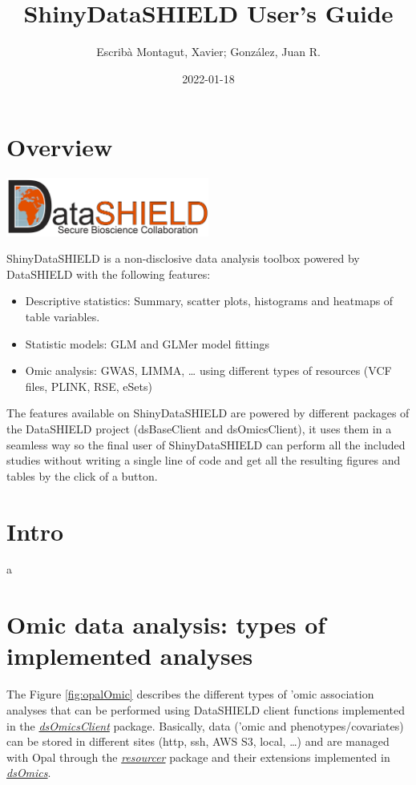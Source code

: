 \documentclass[
]{book}
\title{ShinyDataSHIELD User's Guide}
\author{Escribà Montagut, Xavier; González, Juan R.}
\date{2022-01-18}
\providecommand{\tightlist}{%
  \setlength{\itemsep}{0pt}\setlength{\parskip}{0pt}}
\begin{document}
\maketitle

{
\setcounter{tocdepth}{1}
\tableofcontents
}
\hypertarget{overview}{%
\chapter{Overview}\label{overview}}

\includegraphics[width=0.5\textwidth,height=\textheight]{fig/ds_logo.png}

ShinyDataSHIELD is a non-disclosive data analysis toolbox powered by DataSHIELD with the following features:

\begin{itemize}
\tightlist
\item
  Descriptive statistics: Summary, scatter plots, histograms and heatmaps of table variables.
\item
  Statistic models: GLM and GLMer model fittings
\item
  Omic analysis: GWAS, LIMMA, \ldots{} using different types of resources (VCF files, PLINK, RSE, eSets)
\end{itemize}

The features available on ShinyDataSHIELD are powered by different packages of the DataSHIELD project (dsBaseClient and dsOmicsClient), it uses them in a seamless way so the final user of ShinyDataSHIELD can perform all the included studies without writing a single line of code and get all the resulting figures and tables by the click of a button.

\hypertarget{intro}{%
\chapter{Intro}\label{intro}}

a

\hypertarget{Omic}{%
\chapter{Omic data analysis: types of implemented analyses}\label{Omic}}

The Figure \ref{fig:opalOmic} describes the different types of 'omic association analyses that can be performed using DataSHIELD client functions implemented in the \emph{\href{https://github.com/isglobal-brge/dsOmicsClient}{dsOmicsClient}} package. Basically, data ('omic and phenotypes/covariates) can be stored in different sites (http, ssh, AWS S3, local, \ldots) and are managed with Opal through the \emph{\href{https://github.com/obiba/resourcer}{resourcer}} package and their extensions implemented in \emph{\href{https://github.com/isglobal-brge/dsOmics}{dsOmics}}.
\end{document}
